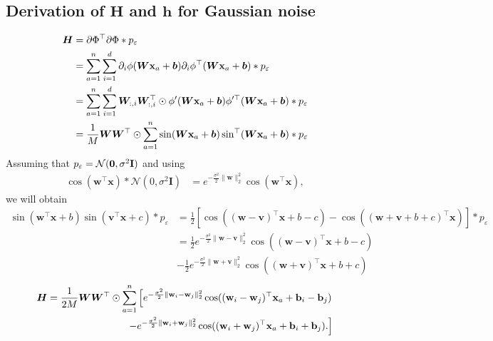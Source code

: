 \subsection{Derivation of \texorpdfstring{${\bm H}$ and ${\bm h}$ for }
 GGaussian noise}
\label{sec:Hh_der}
    \begin{align*}
        {\bm H}
        &= \partial \Phi^{\top}\partial \Phi * p_{\varepsilon}\\
        &= \sum\limits_{a = 1}^n\sum\limits_{i = 1}^d \partial_i \phi(\bm{W}{\bf x}_a + \bm{b})\partial_i \phi^{\top}(\bm{W}{\bf x}_a + \bm{b}) * p_{\varepsilon}\\
        &= \sum\limits_{a = 1}^n\sum\limits_{i = 1}^d \bm{W}_{:, i}\bm{W}_{:, i}^\top \odot \phi'(\bm{W}{\bf x}_a + \bm{b}) \phi'^\top(\bm{W}{\bf x}_a + \bm{b}) * p_{\varepsilon}\\
        &= \frac{1}{M}\bm{W}\bm{W}^{\top} \odot \sum\limits_{a = 1}^n \sin(\bm{W}{\bf x}_a + \bm{b}) \sin^\top(\bm{W}{\bf x}_a + \bm{b}) * p_{\varepsilon}
        \label{eq:H_derivation}
    \end{align*}
    Assuming that $p_{\varepsilon} = {\cal N}({\bf 0}, \sigma^2{\bf I})$ and using
    \begin{align*}
        \cos(\mathbf{w}^\top \mathbf{x}) * \mathcal{N}(0, \sigma^2\mathbf{I}) &=
         e^{-\frac{\sigma^2}{2}\|\mathbf{w}\|_2^2}\cos(\mathbf{w}^\top \mathbf{x}),
    \end{align*}
    we will obtain
    \begin{align*}
        \sin(\mathbf{w^\top x} + b) \sin(\mathbf{v^\top x} + c) * p_{\varepsilon}
        &= \frac{1}{2}\left[\cos ((\mathbf{w - v})^\top \mathbf{x} + b - c) - \cos ((\mathbf{w + v} + b + c)^\top \mathbf{x})\right] * p_{\varepsilon}\\
        &= \frac{1}{2}e^{-\frac{\sigma^2}{2}\|\mathbf{w - v}\|_2^2}\cos ((\mathbf{w - v})^\top \mathbf{x} + b - c)\\
        &- \frac{1}{2}e^{-\frac{\sigma^2}{2}\|\mathbf{w + v}\|_2^2}\cos ((\mathbf{w + v})^\top \mathbf{x} + b + c)
    \end{align*}
    \begin{align}
        {\bm H} = \frac{1}{2M}\bm{W}\bm{W}^{\top} \odot \sum\limits_{a = 1}^n\left[
            e^{-\frac{\sigma^2}{2}\|{\bf w}_i - {\bf w}_j\|_2^2}\cos (({\bf w}_i - {\bf w}_j)^\top \mathbf{x}_a + {\bf b}_i - {\bf b}_j)
            \right .\nonumber \\
            \left .
            - e^{-\frac{\sigma^2}{2}\|{\bf w}_i + {\bf w}_j\|_2^2}\cos (({\bf w}_i + {\bf w}_j)^\top \mathbf{x}_a + {\bf b}_i + {\bf b}_j).
        \right]
    \end{align}
